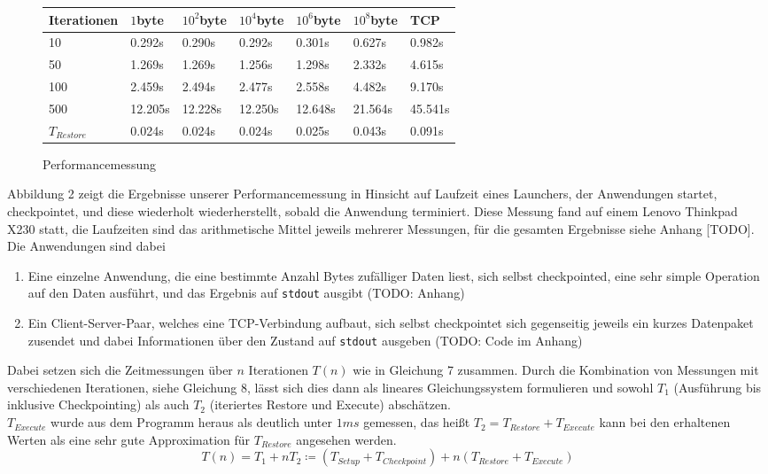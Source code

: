 \documentclass[a4paper]{article}
\begin{document}
\begin{center}
\begin{figure}
\begin{tabular}{| l | l  l  l  l  l | l |}
    \toprule
    Iterationen & $1$byte & $10^2$byte & $10^4$byte & $10^6$byte & $10^8$byte & TCP \\
    \midrule
    10 & 0.292s & 0.290s & 0.292s & 0.301s & 0.627s & 0.982s \\
    50 & 1.269s & 1.269s & 1.256s & 1.298s & 2.332s & 4.615s \\
    100 & 2.459s & 2.494s & 2.477s & 2.558s & 4.482s & 9.170s \\
    500 & 12.205s & 12.228s & 12.250s & 12.648s & 21.564s & 45.541s \\
    \midrule
    $T_{Restore}$ & 0.024s & 0.024s & 0.024s & 0.025s & 0.043s & 0.091s \\
    \bottomrule
\end{tabular}
    \caption{Performancemessung} %
\end{figure}
\end{center}

Abbildung 2 zeigt die Ergebnisse unserer Performancemessung in Hinsicht auf Laufzeit eines Launchers, der Anwendungen startet, checkpointet, und diese wiederholt wiederherstellt, sobald die Anwendung terminiert. Diese Messung fand auf einem Lenovo Thinkpad X230 statt, die Laufzeiten sind das arithmetische Mittel jeweils mehrerer Messungen, für die gesamten Ergebnisse siehe Anhang [TODO].
Die Anwendungen sind dabei
\begin{enumerate}
    \item Eine einzelne Anwendung, die eine bestimmte Anzahl Bytes zufälliger Daten liest, sich selbst checkpointed, eine sehr simple Operation auf den Daten ausführt, und das Ergebnis auf \texttt{stdout} ausgibt (TODO: Anhang)
    \item Ein Client-Server-Paar, welches eine TCP-Verbindung aufbaut, sich selbst checkpointet sich gegenseitig jeweils ein kurzes Datenpaket zusendet und dabei Informationen über den Zustand auf \texttt{stdout} ausgeben (TODO: Code im Anhang)
\end{enumerate}
Dabei setzen sich die Zeitmessungen über $n$ Iterationen $T(n)$ wie in Gleichung 7 zusammen. 
Durch die Kombination von Messungen mit verschiedenen Iterationen, siehe Gleichung 8, lässt sich dies dann als lineares Gleichungssystem formulieren und sowohl $T_1$ (Ausführung bis inklusive Checkpointing) als auch $T_2$ (iteriertes Restore und Execute) abschätzen. \\
$T_{Execute}$ wurde aus dem Programm heraus als deutlich unter $1{ms}$ gemessen, das heißt $T_2 = T_{Restore} + T_{Execute}$ kann bei den erhaltenen Werten als eine sehr gute Approximation für $T_{Restore}$ angesehen werden.
\begin{equation}
    T(n) = T_1 + n T_2 \coloneqq (T_{Setup} + T_{Checkpoint}) + n (T_{Restore} + T_{Execute})
\end{equation}
\end{document}
